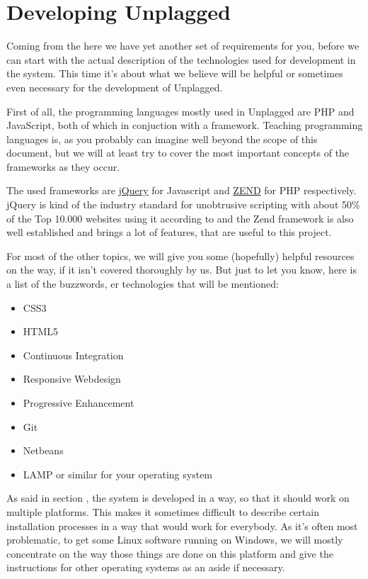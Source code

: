 \chapter{Developing Unplagged}\label{chap:developingUnplagged}

Coming from the  here we have yet another set of requirements for you, before we can
start with the actual description of the technologies used for development in the system. This time it's 
about what we believe will be helpful or sometimes even necessary for the development of Unplagged. 

First of all, the programming languages mostly used in Unplagged are PHP and JavaScript, both of which in conjuction
with a framework. Teaching programming languages is, as you probably can imagine well beyond the scope of this document,
but we will at least try to cover the most important concepts of the frameworks as they occur. 

The used frameworks are 
\href{http://jquery.com/}{jQuery} for Javascript and \href{http://framework.zend.com/docs/overview}{ZEND} for PHP 
respectively. jQuery is kind of the industry standard for unobtrusive scripting with about 50\% 
of the Top 10.000 websites using it according to \citet*{Trends} and the Zend framework is also well established and
brings a lot of features, that are useful to this project.

For most of the other topics, we will give you some (hopefully) helpful resources on the way, if it isn't covered 
thoroughly by us. But just to let you
know, here is a list of the buzzwords, er technologies that will be mentioned:

\begin{itemize}
\item CSS3
\item HTML5
\item Continuous Integration
\item Responsive Webdesign
\item Progressive Enhancement
\item Git
\item Netbeans
\item LAMP or similar for your operating system
\end{itemize}

As said in section , the system is developed in a way, so that it should work on multiple platforms. 
This makes it sometimes difficult to describe certain installation processes in a way that would work for everybody. As
it's often most problematic, to get some Linux software running on Windows, we will mostly concentrate on the way those
things are done on this platform and give the instructions for other operating systems as an aside if necessary.

